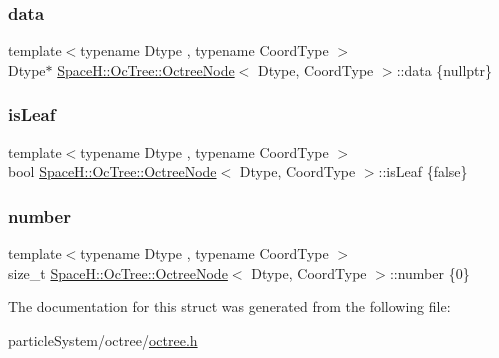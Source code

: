 \subsubsection{\texorpdfstring{data}{data}}
{\footnotesize\ttfamily template$<$typename Dtype , typename Coord\+Type $>$ \\
Dtype$\ast$ \mbox{\hyperlink{struct_space_h_1_1_oc_tree_1_1_octree_node}{Space\+H\+::\+Oc\+Tree\+::\+Octree\+Node}}$<$ Dtype, Coord\+Type $>$\+::data \{nullptr\}}

\mbox{\label{struct_space_h_1_1_oc_tree_1_1_octree_node_a50a0de4997b3b1256d623a0c44d59265}} 
\subsubsection{\texorpdfstring{is\+Leaf}{isLeaf}}
{\footnotesize\ttfamily template$<$typename Dtype , typename Coord\+Type $>$ \\
bool \mbox{\hyperlink{struct_space_h_1_1_oc_tree_1_1_octree_node}{Space\+H\+::\+Oc\+Tree\+::\+Octree\+Node}}$<$ Dtype, Coord\+Type $>$\+::is\+Leaf \{false\}}

\mbox{\label{struct_space_h_1_1_oc_tree_1_1_octree_node_ad1cd17e82094b677b971151652b28067}} 
\subsubsection{\texorpdfstring{number}{number}}
{\footnotesize\ttfamily template$<$typename Dtype , typename Coord\+Type $>$ \\
size\+\_\+t \mbox{\hyperlink{struct_space_h_1_1_oc_tree_1_1_octree_node}{Space\+H\+::\+Oc\+Tree\+::\+Octree\+Node}}$<$ Dtype, Coord\+Type $>$\+::number \{0\}}



The documentation for this struct was generated from the following file\+:\begin{DoxyCompactItemize}
\item 
particle\+System/octree/\mbox{\hyperlink{octree_8h}{octree.\+h}}\end{DoxyCompactItemize}
